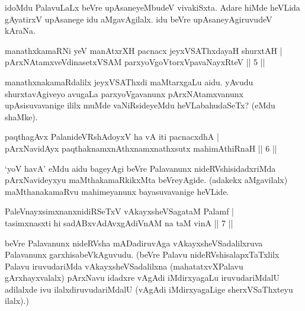 \begin{artha} 
idoMdu PalavuLaLx beVre upAsaneyeMbudeV vivakiSxta. Adare hiMde 
heVLida gAyatirxV upAsanege idu aMgavAgilalx. idu beVre 
upAsaneyAgiruvudeV kAraNa.
\end{artha}


\begin{shl}
manathxkamaRNi yeV manAtxrXH pacnacx jeyxVSAThxdayaH shurxtAH | \\
pArxNAtamxveVdinasetxVSAM parxyoVgoV\s torxVpavaNayxRteV \hfill|| 5 || 
\end{shl}

\begin{artha} 
manathxnakamaRdalilx jeyxVSAThxdi maMtarxgaLu aidu. yAvudu 
shurxtavAgiveyo avugaLa parxyoVgavanunx pArxNAtamxvanunx 
upAsisuvavanige ililx muMde vaNiRside\-yeMdu heVLabahudaSeTx? (eMdu 
shaMke).
\end{artha}


\begin{shl}
paqthagAvx PalanideVRshAdoyxV ha vA iti pacnacxdhA | \\
pArxNavidAyx paqthaknamxnAthxnamxnathxsutx mahimAthiRnaH \hfill|| 6 || 
\end{shl}

\begin{artha} 
`yoV havA' eMdu aidu bageyAgi beVre Palavanunx nideRVshisidadxriMda 
pArxNa\-videyxyu maMthakamaRkikxMta beVreyAgide. (adakekx aMgavilalx) 
maMthanakamaRvu mahimeyanunx bayasuvavanige heVLide.
\end{artha}


\begin{shl}
PaleV\s nayxsimxnanxnidiRSeTxV vAkayxsheVSagataM Palamf | \\
tasimxnasxti hi sadABxvAdAvxgAdiVnAM na taM vinA \hfill|| 7 || 
\end{shl}

\begin{artha} 
beVre Palavanunx nideRVsha mADadiruvAga vAkayxsheVSadalilxruva 
Palavanunx garxhisabeVkAguvudu. (beVre Palavu nideRVshisalapxTaTxlilx 
Palavu iruvudariMda vAkayxsheVSadalilxna (mahatatxvXPalavu 
gArxhayxvalalx) pArxNavu idadxre vAgAdi iMdirxyagaLu iruvudariMdalU 
adilalxde ivu ilalxdiruvudariMdalU (vAgAdi iMdirxyagaLige 
sherxVSaThxteyu ilalx).)
\end{artha}

